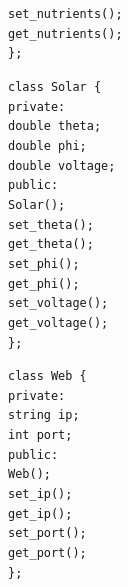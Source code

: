 \begin{flushleft}
\begin{flushleft}
        \quad\quad\texttt{set\_nutrients();} \\
        \quad\quad\texttt{get\_nutrients();} \\
        \texttt{\};} \\
    \end{flushleft}
    \begin{flushleft}
        \texttt{class Solar \{}  \\
        \quad\texttt{private:} \\
        \quad\quad\texttt{double theta;} \\
        \quad\quad\texttt{double phi;} \\
        \quad\quad\texttt{double voltage;} \\
        \quad\texttt{public:} \\
        \quad\quad\texttt{Solar();} \\
        \quad\quad\texttt{set\_theta();} \\
        \quad\quad\texttt{get\_theta();} \\
        \quad\quad\texttt{set\_phi();} \\
        \quad\quad\texttt{get\_phi();} \\
        \quad\quad\texttt{set\_voltage();} \\
        \quad\quad\texttt{get\_voltage();} \\
        \texttt{\};} \\
    \end{flushleft}
    \begin{flushleft}
        \texttt{class Web \{}  \\
        \quad\texttt{private:} \\
        \quad\quad\texttt{string ip;} \\
        \quad\quad\texttt{int port;} \\
        \quad\texttt{public:} \\
        \quad\quad\texttt{Web();} \\
        \quad\quad\texttt{set\_ip();} \\
        \quad\quad\texttt{get\_ip();} \\
        \quad\quad\texttt{set\_port();} \\
        \quad\quad\texttt{get\_port();} \\
        \texttt{\};} \\
    \end{flushleft}


\end{flushleft}
